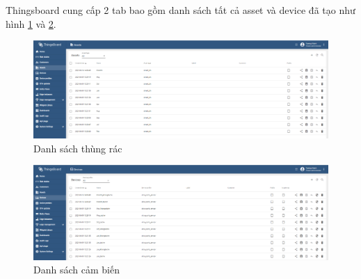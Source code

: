 Thingsboard cung cấp 2 tab bao gồm danh sách tất cả asset và device đã tạo như hình \ref{fig:asset_general} và \ref{fig:device_general}.
\begin{figure}[H]
    \centering
    \includegraphics[width=\textwidth]{images/Khanh/Thingsboard/Assets.PNG}
    \caption{Danh sách thùng rác}
    \label{fig:asset_general}
\end{figure}
\begin{figure}[H]
    \centering
    \includegraphics[width=\textwidth]{images/Khanh/Thingsboard/Devices.PNG}
    \caption{Danh sách cảm biến}
    \label{fig:device_general}
\end{figure}

